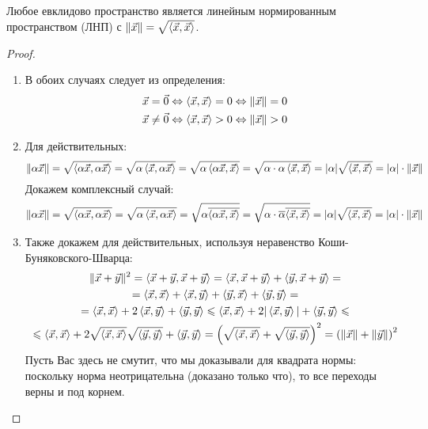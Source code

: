 \begin{lemma} 
	Любое евклидово пространство является линейным 
	нормированным пространством (ЛНП) с $\|\vec{x}\| =
	\sqrt{\left\langle\vec{x}, \vec{x}\right\rangle}$.
\end{lemma}

\begin{proof}~
	\begin{enumerate}
		\item В обоих случаях следует из определения:
		\begin{align*}
			\vec{x} = \vec{0} \Leftrightarrow \left\langle\vec{x}, \vec{x}\right\rangle = 0 \Leftrightarrow \|\vec{x}\| = 0
			\\
			\vec{x} \neq \vec{0} \Leftrightarrow \left\langle\vec{x}, \vec{x}\right\rangle > 0 \Leftrightarrow \|\vec{x}\| > 0
		\end{align*}
		
		\item Для действительных:
			\[
				\|\alpha\vec{x}\| = \sqrt{\left\langle\alpha\vec{x},
				\alpha\vec{x}\right\rangle} = \sqrt{\alpha\left\langle\vec{x},
				\alpha\vec{x}\right\rangle} = \sqrt{\alpha\left\langle\alpha\vec{x},
				\vec{x}\right\rangle} = \sqrt{\alpha \cdot
				\alpha\left\langle\vec{x}, \vec{x}\right\rangle} =
				|\alpha|\sqrt{\left\langle\vec{x}, \vec{x}\right\rangle} = |\alpha|
				\cdot \|\vec{x}\|
			\]
			Докажем комплексный случай:
			\[
				\|\alpha\vec{x}\| = \sqrt{\left\langle\alpha\vec{x},
				\alpha\vec{x}\right\rangle} = \sqrt{\alpha\left\langle\vec{x},
				\alpha\vec{x}\right\rangle} = \sqrt{\alpha\overline{\left\langle\alpha\vec{x},
				\vec{x}\right\rangle}} = \sqrt{\alpha \cdot
				\overline{\alpha}\overline{\left\langle\vec{x}, \vec{x}\right\rangle}} =
				|\alpha|\sqrt{\left\langle\vec{x}, \vec{x}\right\rangle} = |\alpha| \cdot
				\|\vec{x}\|
			\]
		
		\item Также докажем для действительных, используя неравенство
			Коши-Буняковского-Шварца:
			\begin{multline*}
				\|\vec{x} + \vec{y}\|^2 = \left\langle\vec{x} +
				\vec{y}, \vec{x} + \vec{y}\right\rangle =
				\left\langle\vec{x}, \vec{x} + \vec{y}\right\rangle + \left\langle\vec{y},
				\vec{x} + \vec{y}\right\rangle =
				\\
				= \left\langle\vec{x}, \vec{x}\right\rangle + \left\langle\vec{x}, \vec{y}\right\rangle
				+ \left\langle\vec{y}, \vec{x}\right\rangle + \left\langle\vec{y}, \vec{y}\right\rangle =
				\\
				= \left\langle\vec{x}, \vec{x}\right\rangle + 2 \left\langle\vec{x}, \vec{y}\right\rangle +
				\left\langle\vec{y}, \vec{y}\right\rangle
				\leqslant \left\langle\vec{x}, \vec{x}\right\rangle + 2 |\left\langle\vec{x}, \vec{y}\right\rangle| +
				\left\langle\vec{y}, \vec{y}\right\rangle \leqslant
				\\
				\leqslant \left\langle\vec{x}, \vec{x}\right\rangle + 2
				\sqrt{\left\langle\vec{x}, \vec{x}\right\rangle} \sqrt{\left\langle\vec{y}, \vec{y}\right\rangle}
				+ \left\langle\vec{y}, \vec{y}\right\rangle =
				\left(\sqrt{\left\langle\vec{x}, \vec{x}\right\rangle}
				+ \sqrt{\left\langle\vec{y}, \vec{y}\right\rangle}\right)^2
				= \left(\|\vec{x}\| + \|\vec{y}\|\right)^2
			\end{multline*}
			Пусть Вас здесь не смутит, что мы доказывали для квадрата нормы:
			поскольку норма неотрицательна (доказано только что),
			то все переходы верны и под корнем.
			

\end{enumerate}
\end{proof}
